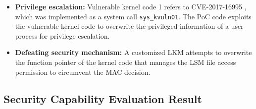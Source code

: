 \begin{itemize}[topsep=0pt]
  
\item {\bf Privilege escalation:} Vulnerable kernel code 1 refers to
  CVE-2017-16995 \cite{CVE-2017-16995}, which was implemented as a system call
  \verb|sys_kvuln01|.
  The PoC code exploits the vulnerable kernel code to overwrite the privileged
  information of a user process for privilege escalation.

  \item {\bf Defeating security mechanism:} A customized LKM attempts to overwrite
  the function pointer of the kernel code that manages the LSM file access
  permission to circumvent the MAC decision.

\end{itemize}


  



\subsection{Security Capability Evaluation Result}
